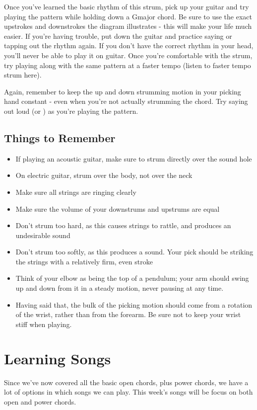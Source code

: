 Once you've learned the basic rhythm of this strum, pick up your guitar and try
playing the pattern while holding down a Gmajor chord. Be sure to use the exact
upstrokes and downstrokes the diagram illustrates - this will make your life
much easier. If you're having trouble, put down the guitar and practice saying
or tapping out the rhythm again. If you don't have the correct rhythm in your
head, you'll never be able to play it on guitar. Once you're comfortable with
the strum, try playing along with the same pattern at a faster tempo (listen to
faster tempo strum here).

Again, remember to keep the up and down strumming motion in your picking hand
constant - even when you're not actually strumming the chord. Try saying out
loud  (or ) as you're playing the
pattern.

\subsection{Things to Remember}
\begin{itemize}
\item If playing an acoustic guitar, make sure to strum directly over the sound hole
\item On electric guitar, strum over the body, not over the neck
\item Make sure all strings are ringing clearly
\item Make sure the volume of your downstrums and upstrums are equal
\item Don't strum too hard, as this causes strings to rattle, and produces an
      undesirable sound
\item Don't strum too softly, as this produces a  sound. Your pick
      should be striking the strings with a relatively firm, even stroke
\item Think of your elbow as being the top of a pendulum; your arm should swing
      up and down from it in a steady motion, never pausing at any time.
\item Having said that, the bulk of the picking motion should come from a
      rotation of the wrist, rather than from the forearm. Be sure not to keep your
      wrist stiff when playing.
\end{itemize}

\section{Learning Songs}
Since we've now covered all the basic open chords, plus power chords, we have a
lot of options in which songs we can play. This week's songs will be focus on
both open and power chords.

